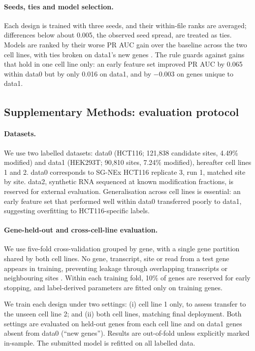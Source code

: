 \documentclass[11pt,a4paper]{article}
\makeatletter
\newcounter{appmarknum}
\DeclareRobustCommand{\appmark}[1]{%
    \refstepcounter{appmarknum}\label{appmark@#1}%
    \textsuperscript{\arabic{appmarknum}}}
\makeatother
\begin{document}
\paragraph{Seeds, ties and model selection.}
Each design is trained with three seeds, and their within-file ranks are
averaged; differences below about 0.005, the observed seed spread, are treated
as ties. Models are ranked by their worse PR AUC gain over the baseline across
the two cell lines, with ties broken on data1's new genes
\citep{gulrajani2021,sagawa2020}. The rule guards against gains that hold in
one cell line only: an early feature set improved PR AUC by 0.065 within data0
but by only 0.016 on data1, and by $-0.003$ on genes unique to data1.

\subsection*{Supplementary Methods: evaluation protocol\texorpdfstring{\appmark{app:evaluation-details}}{}}
\label{app:evaluation-details}


\paragraph{Datasets.}
We use two labelled datasets: data0 (HCT116; 121,838 candidate sites, 4.49\% modified) and data1 (HEK293T; 90,810 sites, 7.24\% modified), hereafter cell lines 1 and 2. data0 corresponds to SG-NEx HCT116 replicate 3, run 1, matched site by site. data2, synthetic RNA sequenced at known modification fractions, is reserved for external evaluation. Generalisation across cell lines is essential: an early feature set that performed well within data0 transferred poorly to data1, suggesting overfitting to HCT116-specific labels.

\paragraph{Gene-held-out and cross-cell-line evaluation.}
We use five-fold cross-validation grouped by gene, with a single gene partition shared by both cell lines. No gene, transcript, site or read from a test gene appears in training, preventing leakage through overlapping transcripts or neighbouring sites \citep{bbag434}. Within each training fold, 10\% of genes are reserved for early stopping, and label-derived parameters are fitted only on training genes.

We train each design under two settings: (i) cell line 1 only, to assess transfer to the unseen cell line 2; and (ii) both cell lines, matching final deployment. Both settings are evaluated on held-out genes from each cell line and on data1 genes absent from data0 (``new genes''). Results are out-of-fold unless explicitly marked in-sample. The submitted model is refitted on all labelled data.
\end{document}
